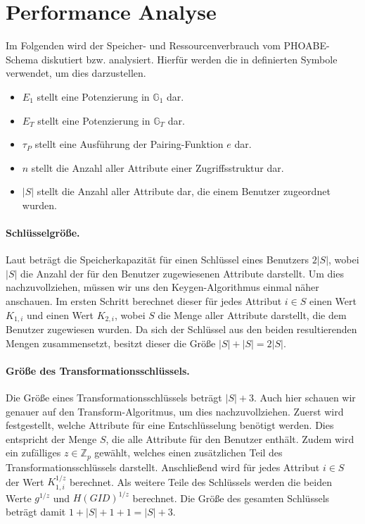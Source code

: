 \newcommand{\sizeof}[1]{\texttt{size}\left( #1 \right)}
\renewcommand{\O}[1]{\mathcal{O} \left( #1 \right)}

\newpage
\section{Performance Analyse}
Im Folgenden wird der Speicher- und Ressourcenverbrauch vom PHOABE-Schema
diskutiert bzw. analysiert. Hierfür werden die in \cite{phoabe} definierten
Symbole verwendet, um dies darzustellen.

\begin{itemize}
  \item $E_1$ stellt eine Potenzierung in $\mathbb{G}_1$ dar.
  \item $E_T$ stellt eine Potenzierung in $\mathbb{G}_T$ dar.
  \item $\tau_P$ stellt eine Ausführung der Pairing-Funktion $e$ dar.
  \item $n$ stellt die Anzahl aller Attribute einer Zugriffsstruktur dar.
  \item $\lvert S \rvert$ stellt die Anzahl aller Attribute dar, die einem
    Benutzer zugeordnet wurden.
\end{itemize}

\paragraph{Schlüsselgröße.}
Laut \cite{phoabe} beträgt die Speicherkapazität für einen Schlüssel eines
Benutzers $2 \lvert S \rvert$, wobei $\lvert S \rvert$ die Anzahl der für
den Benutzer zugewiesenen Attribute darstellt. Um dies nachzuvollziehen, müssen
wir uns den Keygen-Algorithmus einmal näher anschauen. Im ersten Schritt
berechnet dieser für jedes Attribut $i \in S$ einen Wert $K_{1,i}$ und einen Wert
$K_{2,i}$, wobei $S$ die Menge aller Attribute darstellt, die dem Benutzer
zugewiesen wurden. Da sich der Schlüssel aus den beiden resultierenden Mengen
zusammensetzt, besitzt dieser die Größe $\lvert S \rvert + \lvert S \rvert = 2
\lvert S \rvert$.

\paragraph{Größe des Transformationsschlüssels.}
Die Größe eines Transformationsschlüssels beträgt $\lvert S \rvert + 3$. Auch
hier schauen wir genauer auf den Transform-Algoritmus, um dies nachzuvollziehen.
Zuerst wird festgestellt, welche Attribute für eine Entschlüsselung benötigt
werden. Dies entspricht der Menge $S$, die alle Attribute für den Benutzer
enthält. Zudem wird ein zufälliges $z \in \mathbb{Z}_p$ gewählt, welches
einen zusätzlichen Teil des Transformationsschlüssels darstellt. Anschließend
wird für jedes Attribut $i \in S$ der Wert $K_{1,i}^{1/z}$ berechnet. Als
weitere Teile des Schlüssels werden die beiden Werte $g^{1/z}$ und
$H(GID)^{1/z}$ berechnet. Die Größe des gesamten Schlüssels beträgt damit $1 +
\lvert S \rvert + 1 + 1 = \lvert S \rvert + 3$.

